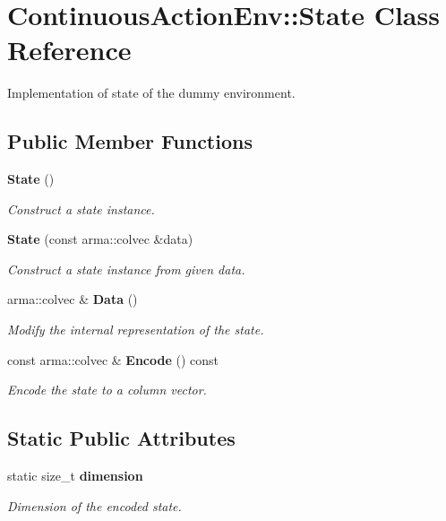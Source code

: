 \section{Continuous\+Action\+Env\+:\+:State Class Reference}
\label{classmlpack_1_1rl_1_1ContinuousActionEnv_1_1State}


Implementation of state of the dummy environment.  


\subsection*{Public Member Functions}
\begin{DoxyCompactItemize}
\item 
\textbf{ State} ()
\begin{DoxyCompactList}\small\item\em Construct a state instance. \end{DoxyCompactList}\item 
\textbf{ State} (const arma\+::colvec \&data)
\begin{DoxyCompactList}\small\item\em Construct a state instance from given data. \end{DoxyCompactList}\item 
arma\+::colvec \& \textbf{ Data} ()
\begin{DoxyCompactList}\small\item\em Modify the internal representation of the state. \end{DoxyCompactList}\item 
const arma\+::colvec \& \textbf{ Encode} () const
\begin{DoxyCompactList}\small\item\em Encode the state to a column vector. \end{DoxyCompactList}\end{DoxyCompactItemize}
\subsection*{Static Public Attributes}
\begin{DoxyCompactItemize}
\item 
static size\+\_\+t \textbf{ dimension}
\begin{DoxyCompactList}\small\item\em Dimension of the encoded state. \end{DoxyCompactList}\end{DoxyCompactItemize}


